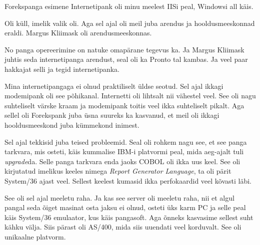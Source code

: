 Forekspanga esimene Internetipank oli minu meelest IISi peal, Windowsi all käis. 


Oli küll, imelik valik oli. Aga sel ajal oli meil juba arendus ja hooldusmeeskonnad eraldi. Margus Kliimask oli arendusmeeskonnas. 


No panga opereerimine on natuke omapärane tegevus ka. Ja Margus Kliimask juhtis seda internetipanga arendust, seal oli ka Pronto tal kambas. Ja  veel paar hakkajat selli ja tegid internetipanka. 


Mina internetipangaga ei olnud praktiliselt üldse seotud. Sel ajal ikkagi modemipank oli see põhikanal. Internetti oli lihtsalt nii vähestel veel. See oli nagu suhteliselt värske kraam ja modemipank toitis veel ikka suhteliselt pikalt. Aga sellel oli Forekspank juba üsna suureks ka kasvanud, et meil oli ikkagi hooldusmeeskond juba kümmekond inimest.


Sel ajal tekkisid juba teised probleemid. Seal oli rohkem nagu see, et see panga tarkvara, mis osteti, käis kummalise IBM-i platvormi peal, mida aeg-ajalt tuli \emph{upgrade}da. Selle panga tarkvara enda jaoks COBOL oli ikka uus keel. See oli kirjutatud imelikus keeles nimega \emph{Report Generator Language}, ta oli pärit System/36 ajast veel. Sellest keelest kumasid ikka perfokaardid veel kõvasti läbi.


See oli sel ajal meeletu raha.  Ja kas see server oli meeletu raha, nii et algul pangal seda õiget masinat osta jaksu ei olnud, osteti üks karm PC ja selle peal käis System/36 emulaator, kus käis pangasoft. Aga õnneks kasvasime sellest suht kähku välja. Siis pärast oli AS/400, mida siis uuendati veel korduvalt. See oli unikaalne platvorm.

